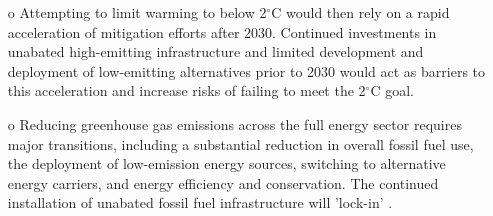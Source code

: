 \begin{frame}
\begin{scriptsize}
\begin{columns}
\begin{itemize}
        \item[o]  Attempting to limit warming to below 2$^\circ$C would then rely on a rapid acceleration of mitigation efforts after 2030. Continued investments in unabated high-emitting infrastructure and limited development and deployment of low-emitting
        alternatives prior to 2030 would act as barriers to this acceleration and increase risks of failing to meet the  2$^\circ$C goal.

        \item[o] Reducing greenhouse gas emissions across the full energy sector requires major transitions, including a substantial reduction in overall fossil fuel use, the deployment of low-emission energy sources, switching to alternative energy carriers, and energy efficiency and conservation. The continued installation of unabated fossil fuel infrastructure will 'lock-in' .
      \end{itemize}

    \end{columns}

  \end{scriptsize}
  \end{frame}   
  
